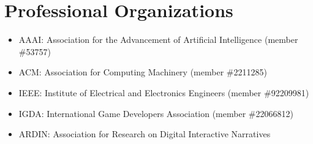 \documentclass{cv}
\begin{document}

\section*{Professional Organizations}
\begin{itemize}
	\item AAAI: Association for the Advancement of Artificial Intelligence (member \#53757)
	\item ACM: Association for Computing Machinery (member \#2211285)
	\item IEEE: Institute of Electrical and Electronics Engineers (member \#92209981)
	\item IGDA: International Game Developers Association (member \#22066812)
	\item ARDIN: Association for Research on Digital Interactive Narratives
\end{itemize}

\end{document}
